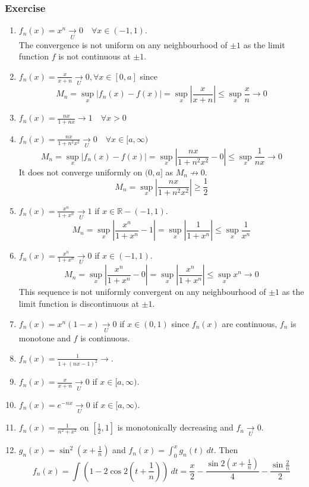 \subsubsection*{Exercise}
\begin{enumerate}
	\item $f_n(x) = x^n \underset{U}{\to} 0 \quad \forall x \in (-1,1)$.\\
	The convergence is not uniform on any neighbourhood of $\pm 1$ as the limit function $f$ is not continuous at $\pm 1$.
	\item $f_n(x) = \frac{x}{x+n} \underset{U}{\to} 0,\forall x \in [0,a]$ since
	$$M_n = \sup_x |f_n(x) - f(x)| = \sup_x \left|\frac{x}{x+n}\right| \le \sup_x \frac{x}{n} \to 0$$
	\item $f_n(x) = \frac{nx}{1+nx} \to 1 \quad \forall x > 0$
	\item $f_n(x) = \frac{nx}{1+n^2x^2} \underset{U}{\to} 0 \quad \forall x \in [a,\infty)$ 
	$$M_n = \sup_x |f_n(x) - f(x)| = \sup_x \left|\frac{nx}{1+n^2x^2} - 0\right| \le \sup_x \frac{1}{nx} \to 0$$
	It does not converge uniformly on $(0,a]$ as $M_n \not\to 0$.
	$$M_n = \sup_x |\frac{nx}{1+n^2x^2}| \ge \frac{1}{2}$$
	\item $f_n(x) = \frac{x^n}{1+x^n} \underset{U}{\to} 1$ if $x \in \mathbb{R} - (-1,1)$.
	$$M_n = \sup_x \left|\frac{x^n}{1+x^n} - 1\right| = \sup_x \left|\frac{1}{1+x^n}\right| \le \sup_x \frac{1}{x^n}$$
	\item $f_n(x) = \frac{x^n}{1+x^n} \underset{U}{\to} 0$ if $x \in (-1,1)$.
		$$M_n = \sup_x \left|\frac{x^n}{1+x^n} - 0\right| = \sup_x \left|\frac{x^n}{1+x^n}\right| \le \sup_x x^n \to 0$$
	This sequence is not uniformly convergent on any neighbourhood of $\pm 1$ as the limit function is discontinuous at $\pm 1$.
	\item $f_n(x) = x^n(1-x) \underset{U}{\to} 0$ if $x \in (0,1)$ since $f_n(x)$ are continuous, $f_n$ is monotone and $f$ is continuous.
	\item $f_n(x) = \frac{1}{1+(nx-1)^2} \to $.
	\item $f_n(x) = \frac{x}{x+n} \underset{U}{\to} 0$ if $x \in [a,\infty)$.
	\item $f_n(x) = e^{-nx} \underset{U}{\to} 0$ if $x \in [a,\infty)$.
	\item $f_n(x) = \frac{1}{n^2+x^2}$ on $[\frac{1}{2},1]$ is monotonically decreasing and $f_n \underset{U}{\to} 0$.
	\item $g_n(x) = \sin^2(x + \frac{1}{n})$ and $f_n(x) = \int_0^x g_n(t)\ dt$. Then $$f_n(x) = \int (1 - 2\cos 2(t + \frac{1}{n}))\ dt = \frac{x}{2} - \frac{\sin 2(x+\frac{1}{n})}{4} - \frac{\sin \frac{2}{n}}{2}$$ 

\end{enumerate}
